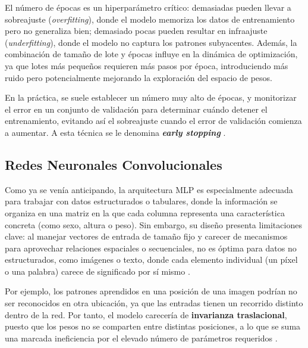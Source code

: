 \begin{itemize}
    El número de épocas es un hiperparámetro crítico: demasiadas pueden llevar a sobreajuste 
    (\textit{overfitting}), donde el modelo memoriza los datos de entrenamiento pero no generaliza bien; 
    demasiado pocas pueden resultar en infraajuste (\textit{underfitting}), donde el modelo no captura los 
    patrones subyacentes. Además, la combinación de tamaño de lote y épocas influye en la dinámica de 
    optimización, ya que lotes más pequeños requieren más pasos por época, introduciendo más ruido pero 
    potencialmente mejorando la exploración del espacio de pesos.

    En la práctica, se suele establecer un número muy alto de épocas, y monitorizar el error en un conjunto de
    validación para determinar cuándo detener el entrenamiento, evitando así el sobreajuste cuando el error de
    validación comienza a aumentar. A esta técnica se le denomina \textbf{\textit{early stopping}} 
    \cite{goodfellow2016}.
    
\end{itemize}



\subsection{Redes Neuronales Convolucionales}

Como ya se venía anticipando, la arquitectura MLP es especialmente adecuada para trabajar con datos 
estructurados o tabulares, donde la información se organiza en una matriz en la que cada columna representa 
una característica concreta (como sexo, altura o peso). 
Sin embargo, su diseño presenta limitaciones clave: al manejar vectores de entrada de tamaño fijo y carecer 
de mecanismos para aprovechar relaciones espaciales o secuenciales, no es óptima para datos no estructurados, 
como imágenes o texto, donde cada elemento individual (un píxel o una palabra) carece de significado por sí 
mismo \cite{murphy2022}.

Por ejemplo, los patrones aprendidos en una posición de una imagen podrían no ser reconocidos en otra 
ubicación, ya que las entradas tienen un recorrido distinto dentro de la red. Por tanto, el modelo carecería       %
de \textbf{invarianza traslacional}, puesto que los pesos no se comparten entre distintas posiciones, a lo que 
se suma una marcada ineficiencia por el elevado número de parámetros requeridos \cite{szeliski2010}.

